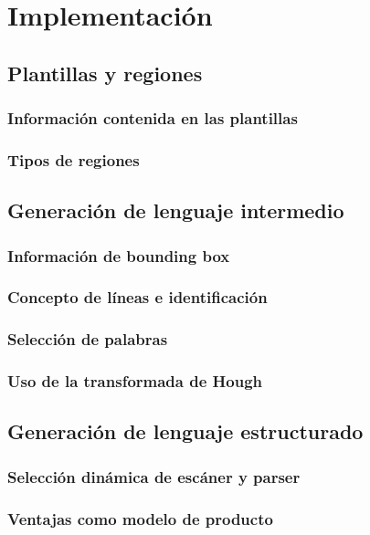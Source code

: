 
\chapter{Implementación}
\label{chap:implemetación}

\section{Plantillas y regiones}
\subsection{Información contenida en las plantillas}
\subsection{Tipos de regiones}

\section{Generación de lenguaje intermedio}
\subsection{Información de bounding box}
\subsection{Concepto de líneas e identificación}
\subsection{Selección de palabras}
\subsection{Uso de la transformada de Hough}

\section{Generación de lenguaje estructurado}
\subsection{Selección dinámica de escáner y parser}
\subsection{Ventajas como modelo de producto}

